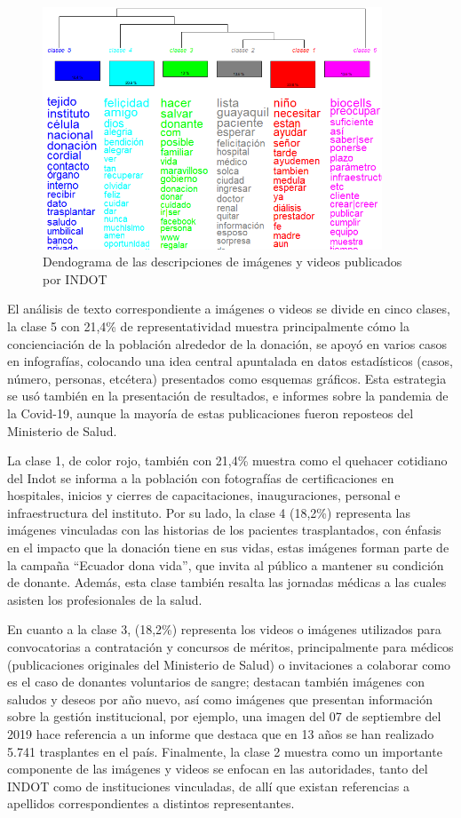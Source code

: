 \documentclass[spanish]{textolivre}
\begin{document}
\begin{figure}[htbp]
 \centering
 \includegraphics[width=0.9\textwidth]{figure02.png}
 \caption{Dendograma de las descripciones de imágenes y videos publicados por INDOT}
 \label{fig3}
\end{figure}

El análisis de texto correspondiente a imágenes o videos se divide en cinco clases, la clase 5 con 21,4\% de representatividad muestra principalmente cómo la concienciación de la población alrededor de la donación, se apoyó en varios casos en infografías, colocando una idea central apuntalada en datos estadísticos (casos, número, personas, etcétera) presentados como esquemas gráficos. Esta estrategia se usó también en la presentación de resultados, e informes sobre la pandemia de la Covid-19, aunque la mayoría de estas publicaciones fueron reposteos del Ministerio de Salud.

La clase 1, de color rojo, también con 21,4\% muestra como el quehacer cotidiano del Indot se informa a la población con fotografías de certificaciones en hospitales, inicios y cierres de capacitaciones, inauguraciones, personal e infraestructura del instituto. Por su lado, la clase 4 (18,2\%) representa las imágenes vinculadas con las historias de los pacientes trasplantados, con énfasis en el impacto que la donación tiene en sus vidas, estas imágenes forman parte de la campaña “Ecuador dona vida”, que invita al público a mantener su condición de donante. Además, esta clase también resalta las jornadas médicas a las cuales asisten los profesionales de la salud.

En cuanto a la clase 3, (18,2\%) representa los videos o imágenes utilizados para convocatorias a contratación y concursos de méritos, principalmente para médicos (publicaciones originales del Ministerio de Salud) o invitaciones a colaborar como es el caso de donantes voluntarios de sangre; destacan también imágenes con saludos y deseos por año nuevo, así como imágenes que presentan información sobre la gestión institucional, por ejemplo, una imagen del 07 de septiembre del 2019 hace referencia a un informe que destaca que en 13 años se han realizado 5.741 trasplantes en el país. Finalmente, la clase 2 muestra como un importante componente de las imágenes y videos se enfocan en las autoridades, tanto del INDOT como de instituciones vinculadas, de allí que existan referencias a apellidos correspondientes a distintos representantes.
\end{document}
